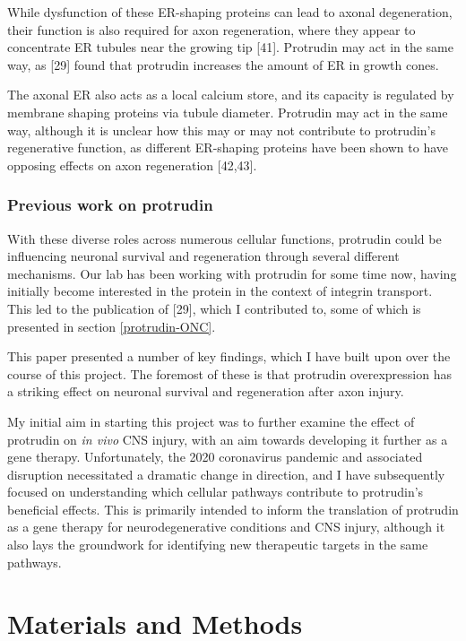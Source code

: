 \documentclass[
  12pt,
  a4paper,
]{book}
\begin{document}
While dysfunction of these ER-shaping proteins can lead to axonal degeneration, their function is also required for axon regeneration, where they appear to concentrate ER tubules near the growing tip {[}41{]}. Protrudin may act in the same way, as {[}29{]} found that protrudin increases the amount of ER in growth cones.

The axonal ER also acts as a local calcium store, and its capacity is regulated by membrane shaping proteins via tubule diameter. Protrudin may act in the same way, although it is unclear how this may or may not contribute to protrudin's regenerative function, as different ER-shaping proteins have been shown to have opposing effects on axon regeneration {[}42,43{]}.

\hypertarget{previous-work-on-protrudin}{%
\subsection{Previous work on protrudin}\label{previous-work-on-protrudin}}

With these diverse roles across numerous cellular functions, protrudin could be influencing neuronal survival and regeneration through several different mechanisms. Our lab has been working with protrudin for some time now, having initially become interested in the protein in the context of integrin transport. This led to the publication of {[}29{]}, which I contributed to, some of which is presented in section \ref{protrudin-ONC}.

This paper presented a number of key findings, which I have built upon over the course of this project. The foremost of these is that protrudin overexpression has a striking effect on neuronal survival and regeneration after axon injury.

My initial aim in starting this project was to further examine the effect of protrudin on \emph{in vivo} CNS injury, with an aim towards developing it further as a gene therapy. Unfortunately, the 2020 coronavirus pandemic and associated disruption necessitated a dramatic change in direction, and I have subsequently focused on understanding which cellular pathways contribute to protrudin's beneficial effects. This is primarily intended to inform the translation of protrudin as a gene therapy for neurodegenerative conditions and CNS injury, although it also lays the groundwork for identifying new therapeutic targets in the same pathways.

\hypertarget{METHODS}{%
\chapter*{Materials and Methods}\label{METHODS}}
\end{document}
